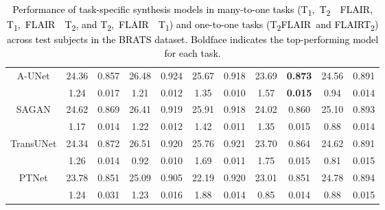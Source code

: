 \documentclass[journal,twoside,web]{ieeecolor}
\newcommand{\TtwoFlair}{T\textsubscript{2}FLAIR}
\newcommand{\FlairTtwo}{FLAIRT\textsubscript{2}}
\newcommand{\TtwoFlairTone}{T\textsubscript{2},~FLAIR~~T\textsubscript{1}}
\newcommand{\ToneFlairTtwo}{T\textsubscript{1},~FLAIR~~T\textsubscript{2}}
\newcommand{\ToneTtwoFlair}{T\textsubscript{1},~T\textsubscript{2}~~FLAIR}
\newcommand*{\revhl}{\textcolor{black}}
\begin{document}
\begin{table}[]
{\begin{tabular}{ccccccccccc}
\multirow{2}{*}{A-UNet}    &        24.36   &   0.857       &  26.48         &      0.924    &      25.67     & 0.918  &      23.69     & \textbf{0.873} &      24.56     & 0.891         \\
                           &    1.24       &  0.017        &  1.21         &   0.012       &   1.35        &     0.010 &   1.57        &     \textbf{0.015} &   0.94        &     0.014         \\ \hline
\multirow{2}{*}{SAGAN}     &     24.62      &   0.869       &   26.41        &      0.919    &      25.91     &     0.918  &      24.02     &     0.860 &      25.10     &     0.893    \\
                           &    1.17       &  0.014        &  1.22         &   0.012       &   1.42       &     0.011    &   1.35       &     0.015 &   0.88       &     0.014       \\ \hline
\multirow{2}{*}{TransUNet} &      24.34     &   0.872       &   26.51        &  0.920        &      25.76     & 0.921  &      23.70     & 0.864&      24.62     & 0.891       \\
                          &    1.26       &  0.014        &  0.92         &   0.010      &   1.69       &     0.011 &   1.75       &     0.015 &   0.81       &     0.015          \\ \hline
\multirow{2}{*}{PTNet} &      23.78     &   0.851       &   25.09        &  0.905        &      22.19     & 0.920  
&      23.01     & 0.851&      24.78     & 0.894       \\
                          &    1.24       &  0.031        &  1.23         &   0.016      &   1.88       &     0.014 &   0.85       &     0.014 &   0.88       &     0.015         \\ \hline                          
\end{tabular}}
\caption{
\revhl{Performance of task-specific synthesis models in many-to-one tasks (\ToneTtwoFlair, \ToneFlairTtwo, and \TtwoFlairTone) and one-to-one tasks (\TtwoFlair~and \FlairTtwo) across test subjects in the BRATS dataset. Boldface indicates the top-performing model for each task.}}
\label{tab:brats_many}
\vspace{-1ex}
\end{table}
\end{document}
